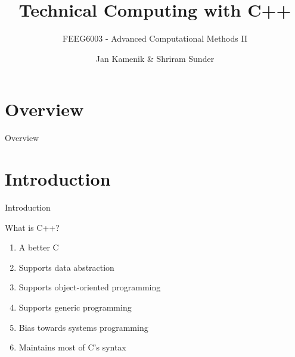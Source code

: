 \documentclass[compress]{beamer}
\title{\LARGE Technical Computing with C++}
\subtitle{FEEG6003 - Advanced Computational Methods II}
\date{}
\author{Jan Kamenik \& Shriram Sunder}
\institute{Centre for Doctoral Training in Next Generation Computational Modelling}
\begin{document}
%
%

\maketitle


%
%

\section*{Overview}
\begin{frame}{Overview}
\tableofcontents[hideallsubsections]
\end{frame}

%
%

\section{Introduction}


\begin{frame}{Introduction}

\begin{block}{What is C++?}
	\begin{enumerate}
		\item A better C
		\item Supports data abstraction
		\item Supports object-oriented programming  
		\item Supports generic programming
		\item Bias towards systems programming
		\item Maintains most of C's syntax
	\end{enumerate}
\end{block}

\end{frame}
\end{document}

